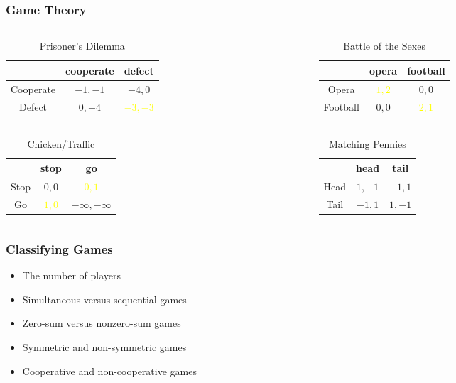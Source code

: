 \documentclass[UTF8,11pt,colorlinks,compress,openany]{beamer}%
\begin{document}
\begin{frame}\frametitle{Game Theory}
\begin{columns}
\begin{table}
\abovetabulinesep=1mm
\belowtabulinesep=1mm
\begin{tabu}{c|cc}
\hline
 & cooperate & defect\\
\hline
Cooperate & $-1,-1$ & $-4,0$\\
Defect & $0,-4$ &\textcolor{yellow}{$-3,-3$}\\
\hline
\end{tabu}\caption{Prisoner's Dilemma}
\end{table}
\begin{table}
\abovetabulinesep=1mm
\belowtabulinesep=1mm
\begin{tabu}{c|cc}
\hline
 & opera & football\\
\hline
Opera & \textcolor{yellow}{$1,2$} & $0,0$\\
Football & $0,0$ & \textcolor{yellow}{$2,1$}\\
\hline
\end{tabu}\caption{Battle of the Sexes}
\end{table}
\end{columns}
\begin{columns}
\begin{table}
\abovetabulinesep=1mm
\belowtabulinesep=1mm
\begin{tabu}{c|cc}
\hline
 & stop & go\\
\hline
Stop & $0,0$ & \textcolor{yellow}{$0,1$}\\
Go & \textcolor{yellow}{$1,0$} & $-\infty,-\infty$\\
\hline
\end{tabu}
\caption{\footnotesize Chicken/Traffic}
\end{table}
\begin{table}
\abovetabulinesep=1mm
\belowtabulinesep=1mm
\begin{tabu}{c|cc}
\hline
 & head & tail\\
\hline
Head & $1,-1$ & $-1,1$\\
Tail & $-1,1$ & $1,-1$\\
\hline
\end{tabu}\caption{Matching Pennies}
\end{table}
\end{columns}
\end{frame}

\begin{frame}\frametitle{Classifying Games}
\begin{itemize}
	\item The number of players
	\item Simultaneous versus sequential games
	\item Zero-sum versus nonzero-sum games
	\item Symmetric and non-symmetric games
	\item Cooperative and non-cooperative games
\end{itemize}
\end{frame}
\end{document}
